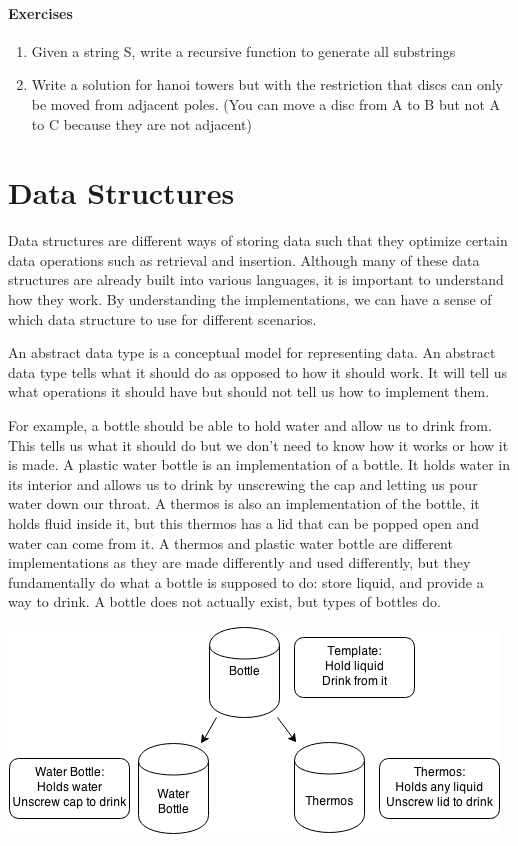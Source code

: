 \documentclass[11pt,oneside]{book}
\makeatletter
\def\maxwidth#1{\ifdim\Gin@nat@width>#1 #1\else\Gin@nat@width\fi}
\makeatother
\begin{document}
\subsection{Exercises}

\begin{enumerate}
\item Given a string S, write a recursive function to generate all substrings
\item Write a solution for hanoi towers but with the restriction that discs can only be moved from adjacent poles. (You can move a disc from A to B but not A to C because they are not adjacent)
\end{enumerate}

\part{ Data Structures }
    

Data structures are different ways of storing data such that they optimize certain data operations such as retrieval and insertion. Although many of these data structures are already built into various languages, it is important to understand how they work. By understanding the implementations, we can have a sense of which data structure to use for different scenarios.

An abstract data type is a conceptual model for representing data. An abstract data type tells what it should do as opposed to how it should work. It will tell us what operations it should have but should not tell us how to implement them.

For example, a bottle should be able to hold water and allow us to drink from. This tells us what it should do but we don't need to know how it works or how it is made. A plastic water bottle is an implementation of a bottle. It holds water in its interior and allows us to drink by unscrewing the cap and letting us pour water down our throat. A thermos is also an implementation of the bottle, it holds fluid inside it, but this thermos has a lid that can be popped open and water can come from it. A thermos and plastic water bottle are different implementations as they are made differently and used differently, but they fundamentally do what a bottle is supposed to do: store liquid, and provide a way to drink. A bottle does not actually exist, but types of bottles do.

\includegraphics[width=\maxwidth{\textwidth}]{bottle.png}
\end{document}
